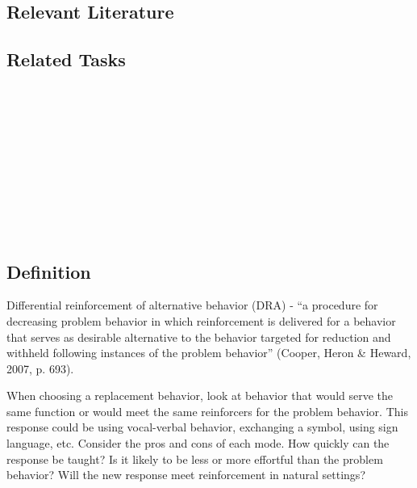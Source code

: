 \subsection{Relevant Literature}
\begin{refsection}
\nocite{test,alang2017police,clayton2018black}
\printbibliography[heading=none]
\end{refsection}
%
\subsection{Related Tasks}
\fourbThree{}\\
\fourgEight{}\\
\fourhThree{}\\
\fourjTwo{}\\
\fourjSeven{}\\
\fourjEight{}\\
\fourjTen{}\\
\fourkTwo{}\\
\fourkSeven{}\\
%
%
%
%
%
%
%
%
\section[\fourjTen{}]{\fourjTen{}%
              }
\subsection{Definition}
Differential reinforcement of alternative behavior (DRA) -  ``a procedure for decreasing problem behavior in which reinforcement is delivered for a behavior that serves as desirable alternative to the behavior targeted for reduction and withheld following instances of the problem behavior'' (Cooper, Heron \& Heward, 2007, p. 693).  

When choosing a replacement behavior, look at behavior that would serve the same function or would meet the same reinforcers for the problem behavior. This response could be using vocal-verbal behavior, exchanging a symbol, using sign language, etc. Consider the pros and cons of each mode. How quickly can the response be taught? Is it likely to be less or more effortful than the problem behavior? Will the new response meet reinforcement in natural settings?

